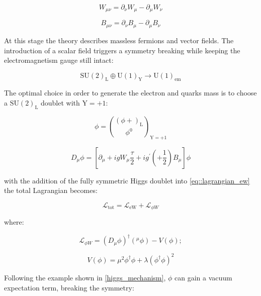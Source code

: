 \begin{equation}
W_{\mu\nu} =\partial_{\nu}W_{\mu} - \partial_{\mu}W_{\nu} 
\end{equation}

\begin{equation}
B_{\mu\nu} =\partial_{\nu}B_{\mu} - \partial_{\mu}B_{\nu} 
\end{equation}

At this stage the theory describes massless fermions and vector fields. The introduction of a scalar field triggers a symmetry breaking while keeping the electromagnetism gauge still intact:

\begin{equation}
\text{SU}(2)_{\text{L}} \oplus \text{U}(1)_{\text{Y}} \rightarrow \text{U}(1)_{\text{em}}
\end{equation}

The optimal choice in order to generate the electron and quarks mass is to choose a $\text{SU}(2)_{\text{L}}$ doublet with $\text{Y} = +1$: 

\begin{equation}
\phi = \binom{(\phi{+})_{\text{L}}}{\phi^{0}}_{\text{Y}=+1}
\label{eq::su2_doublet}
\end{equation}

\begin{equation}
D_{\mu}\phi = [\partial_{\mu} + igW_{\mu} \dfrac{\tau}{2}  + ig^{\prime}(+\dfrac{1}{2})B_{\mu}]\phi 
\end{equation}


with the addition of the fully symmetric Higgs doublet into \autoref{eq::lagrangian_ew} the total Lagrangian becomes:

\begin{equation}
\mathcal{L}_{\text{tot}} = \mathcal{L}_{\text{eW}} + \mathcal{L}_{\phi W}
\end{equation}

where:

\begin{equation}
\mathcal{L}_{\phi W} = (D_{\mu}\phi)^{\dagger} (^{\mu}\phi) - V (\phi);
\label{eq::lagrangian_phiW}
\end{equation}

\begin{equation}
V(\phi) = \mu^{2}\phi^{\dagger}\phi + \lambda(\phi^{\dagger}\phi)^{2}
\end{equation}

Following the example shown in \autoref{higgs_mechanism}, $\phi$ can gain a vacuum expectation term, breaking the symmetry:

